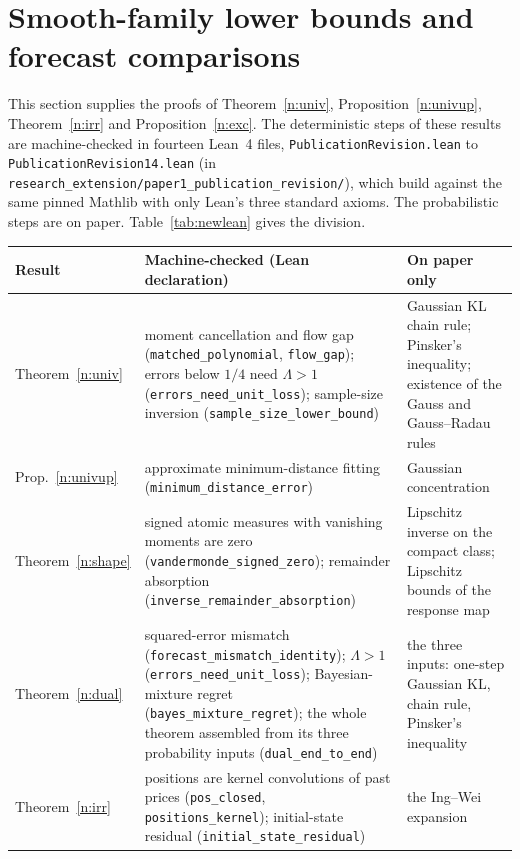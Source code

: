 \documentclass[12pt]{article}
\theoremstyle{definition}
\theoremstyle{remark}
\begin{document}
\section{Smooth-family lower bounds and forecast comparisons}\label{app:univirr}

This section supplies the proofs of Theorem~\ref{n:univ}, Proposition~\ref{n:univup}, Theorem~\ref{n:irr} and Proposition~\ref{n:exc}. The deterministic steps of these results are machine-checked in fourteen Lean~4 files, \nolinkurl{PublicationRevision.lean} to \nolinkurl{PublicationRevision14.lean} (in \nolinkurl{research_extension/paper1_publication_revision/}), which build against the same pinned Mathlib with only Lean's three standard axioms. The probabilistic steps are on paper. Table~\ref{tab:newlean} gives the division.
\begin{table}[ht]\centering\small
\begin{tabular}{>{\raggedright\arraybackslash}p{}>{\raggedright\arraybackslash}p{}>{\raggedright\arraybackslash}p{}}\toprule
Result & Machine-checked (Lean declaration) & On paper only\\\midrule
Theorem~\ref{n:univ} & moment cancellation and flow gap (\texttt{matched\_polynomial}, \texttt{flow\_gap}); errors below $1/4$ need $\Lambda>1$ (\texttt{errors\_need\_unit\_loss}); sample-size inversion (\texttt{sample\_size\_lower\_bound}) & Gaussian KL chain rule; Pinsker's inequality; existence of the Gauss and Gauss--Radau rules\\
Prop.~\ref{n:univup} & approximate minimum-distance fitting (\texttt{minimum\_distance\_error}) & Gaussian concentration\\
Theorem~\ref{n:shape} & signed atomic measures with vanishing moments are zero (\texttt{vandermonde\_signed\_zero}); remainder absorption (\texttt{inverse\_remainder\_absorption}) & Lipschitz inverse on the compact class; Lipschitz bounds of the response map\\
Theorem~\ref{n:dual} & squared-error mismatch (\texttt{forecast\_mismatch\_identity}); $\Lambda>1$ (\texttt{errors\_need\_unit\_loss}); Bayesian-mixture regret (\texttt{bayes\_mixture\_regret}); the whole theorem assembled from its three probability inputs (\texttt{dual\_end\_to\_end}) & the three inputs: one-step Gaussian KL, chain rule, Pinsker's inequality\\
Theorem~\ref{n:irr} & positions are kernel convolutions of past prices (\texttt{pos\_closed}, \texttt{positions\_kernel}); initial-state residual (\texttt{initial\_state\_residual}) & the Ing--Wei expansion\\

\end{tabular}
\end{table}
\end{document}
